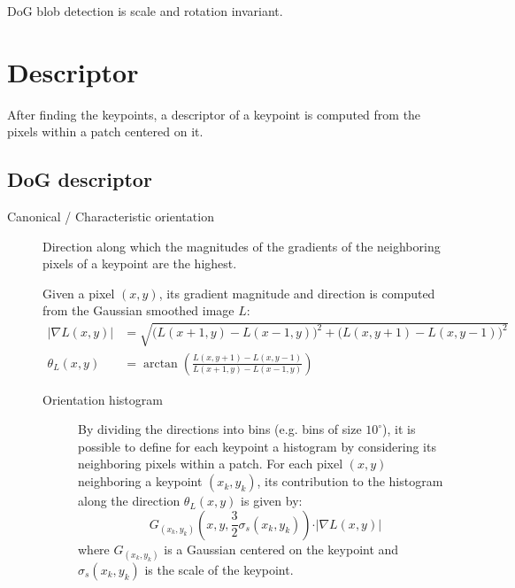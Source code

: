 \begin{remark}
    DoG blob detection is scale and rotation invariant.
\end{remark}



\section{Descriptor}

After finding the keypoints, a descriptor of a keypoint is computed from the pixels within a patch centered on it.


\subsection{DoG descriptor}

\begin{description}
    \item[Canonical / Characteristic orientation] 
        Direction along which the magnitudes of the gradients of the neighboring pixels of a keypoint are the highest.

        Given a pixel $(x, y)$, its gradient magnitude and direction is computed from the Gaussian smoothed image $L$:
        \[ 
            \begin{split}
                \vert \nabla L(x, y) \vert &= \sqrt{ \big( L(x+1, y) - L(x-1, y) \big)^2 + \big( L(x, y+1) - L(x, y-1) \big)^2 } \\
                \theta_L(x, y) &= \arctan\left( \frac{L(x, y+1) - L(x, y-1)}{L(x+1, y) - L(x-1, y)} \right)
            \end{split}
        \] 

        \begin{description}
            \item[Orientation histogram] 
                By dividing the directions into bins (e.g. bins of size $10^\circ$),
                it is possible to define for each keypoint a histogram by considering its neighboring pixels within a patch.
                For each pixel $(x, y)$ neighboring a keypoint $(x_k, y_k)$, its contribution to the histogram along the direction $\theta_L(x, y)$ is given by:
                \[ G_{(x_k, y_k)}(x, y, \frac{3}{2} \sigma_s(x_k, y_k)) \cdot \vert \nabla L(x, y) \vert \]
                where $G_{(x_k, y_k)}$ is a Gaussian centered on the keypoint and  $\sigma_s(x_k, y_k)$ is the scale of the keypoint.


\end{description}
\end{description}

